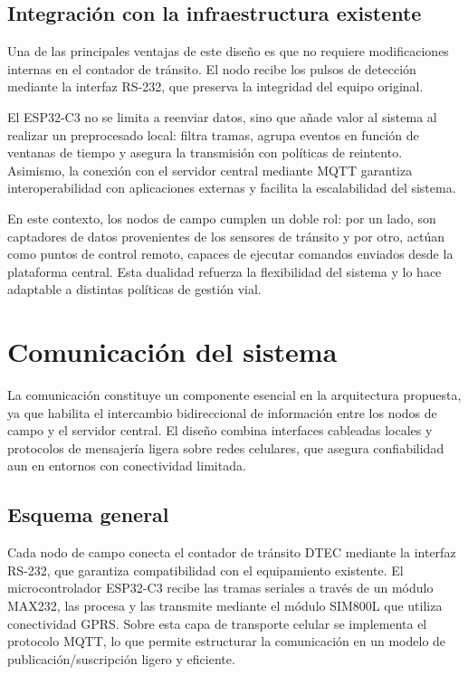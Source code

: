 \subsection{Integración con la infraestructura existente}
Una de las principales ventajas de este diseño es que no requiere modificaciones internas en el contador de tránsito. El nodo recibe los pulsos de detección mediante la interfaz RS-232, que preserva la integridad del equipo original. 

El ESP32-C3 no se limita a reenviar datos, sino que añade valor al sistema al realizar un preprocesado local: filtra tramas, agrupa eventos en función de ventanas de tiempo y asegura la transmisión con políticas de reintento. Asimismo, la conexión con el servidor central mediante MQTT garantiza interoperabilidad con aplicaciones externas y facilita la escalabilidad del sistema.

En este contexto, los nodos de campo cumplen un doble rol: por un lado, son captadores de datos provenientes de los sensores de tránsito y por otro, actúan como puntos de control remoto, capaces de ejecutar comandos enviados desde la plataforma central. Esta dualidad refuerza la flexibilidad del sistema y lo hace adaptable a distintas políticas de gestión vial.



\section{Comunicación del sistema}
\label{sec:comunicacion}

La comunicación constituye un componente esencial en la arquitectura propuesta, ya que habilita el intercambio bidireccional de información entre los nodos de campo y el servidor central. El diseño combina interfaces cableadas locales y protocolos de mensajería ligera sobre redes celulares, que asegura confiabilidad aun en entornos con conectividad limitada.

\subsection{Esquema general}
Cada nodo de campo conecta el contador de tránsito DTEC mediante la interfaz RS-232, que garantiza compatibilidad con el equipamiento existente. El microcontrolador ESP32-C3 recibe las tramas seriales a través de un módulo MAX232, las procesa y las transmite mediante el módulo SIM800L que utiliza conectividad GPRS.  
Sobre esta capa de transporte celular se implementa el protocolo MQTT, lo que permite estructurar la comunicación en un modelo de publicación/suscripción ligero y eficiente.  

